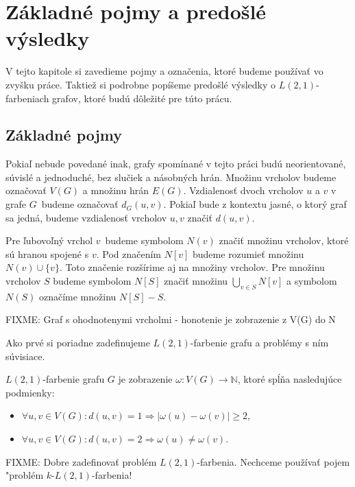 \chapter{Základné pojmy a predošlé výsledky}

V tejto kapitole si zavedieme pojmy a označenia, ktoré budeme používať
vo zvyšku práce. Taktiež si podrobne popíšeme predošlé výsledky o
$L(2,1)$-farbeniach grafov, ktoré budú dôležité pre túto prácu.

\section{Základné pojmy}

Pokiaľ nebude povedané inak, grafy spomínané v tejto práci budú neorientované,
súvislé a jednoduché, bez slučiek a násobných hrán. Množinu vrcholov budeme
označovať $V(G)$ a množinu hrán $E(G)$. Vzdialenosť dvoch vrcholov $u$ a $v$
v grafe $G$ budeme označovať $d_G(u,v)$. Pokiaľ bude z kontextu jasné, o
ktorý graf sa jedná, budeme vzdialenosť vrcholov $u, v$ značiť $d(u,v)$.

Pre ľubovoľný vrchol $v$ budeme symbolom $N(v)$ značiť množinu vrcholov, ktoré
sú hranou spojené s $v$. Pod značením $N[v]$ budeme rozumieť množinu $N(v) \cup \{v\}$.
Toto značenie rozšírime aj na množiny vrcholov. Pre množinu vrcholov $S$ budeme
symbolom $N[S]$ značiť množinu $\bigcup \limits_{v \in S} N[v]$ a symbolom
$N(S)$ označíme množinu $N[S] - S$.

FIXME: Graf s ohodnotenymi vrcholmi - honotenie je zobrazenie z V(G) do N

Ako prvé si poriadne
zadefinujeme $L(2,1)$-farbenie grafu a problémy s ním súvisiace.

\begin{defn}
    $L(2,1)$-farbenie grafu $G$ je zobrazenie $\omega : V(G) \to \mathbb{N}$,
    ktoré spĺňa nasledujúce podmienky:

    \begin{itemize}
        \item $\forall u, v \in V(G): d(u, v) = 1 \Rightarrow \left| \omega(u) - \omega(v) \right| \ge 2$,
        \item $\forall u, v \in V(G): d(u, v) = 2 \Rightarrow \omega(u) \neq \omega(v)$.
    \end{itemize}
\end{defn}

FIXME: Dobre zadefinovať problém $L(2,1)$-farbenia. Nechceme používať pojem
"problém $k$-$L(2,1)$-farbenia!

